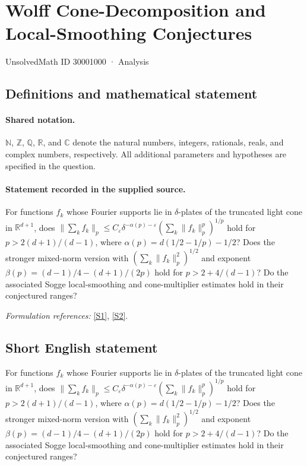 \documentclass[11pt]{article}
\newcommand{\sref}[2]{\hyperlink{source:#1:#2}{[S#2]}}
\begin{document}
\setcounter{section}{30000999}
\section{Wolff Cone-Decomposition and Local-Smoothing Conjectures}\label{30001000}
{\small UnsolvedMath ID 30001000 · Analysis}
\subsection{Definitions and mathematical statement}

\paragraph{Shared notation.}$\mathbb N$, $\mathbb Z$, $\mathbb Q$, $\mathbb R$, and $\mathbb C$ denote the natural numbers, integers, rationals, reals, and complex numbers, respectively. All additional parameters and hypotheses are specified in the question.


\paragraph{Statement recorded in the supplied source.}
For functions $f_k$ whose Fourier supports lie in $\delta$-plates of the truncated light cone in $\mathbb{R}^{d+1}$, does $\lVert\sum_k f_k\rVert_p\leq C_\varepsilon\delta^{-\alpha(p)-\varepsilon}(\sum_k\lVert f_k\rVert_p^p)^{1/p}$ hold for $p>2(d+1)/(d-1)$, where $\alpha(p)=d(1/2-1/p)-1/2$? Does the stronger mixed-norm version with $(\sum_k\lVert f_k\rVert_p^2)^{1/2}$ and exponent $\beta(p)=(d-1)/4-(d+1)/(2p)$ hold for $p>2+4/(d-1)$? Do the associated Sogge local-smoothing and cone-multiplier estimates hold in their conjectured ranges?
\par\smallskip\textit{Formulation references:} \sref{30001000}{1}, \sref{30001000}{2}.
\subsection{Short English statement}
For functions $f_k$ whose Fourier supports lie in $\delta$-plates of the truncated light cone in $\mathbb{R}^{d+1}$, does $\lVert\sum_k f_k\rVert_p\leq C_\varepsilon\delta^{-\alpha(p)-\varepsilon}(\sum_k\lVert f_k\rVert_p^p)^{1/p}$ hold for $p>2(d+1)/(d-1)$, where $\alpha(p)=d(1/2-1/p)-1/2$? Does the stronger mixed-norm version with $(\sum_k\lVert f_k\rVert_p^2)^{1/2}$ and exponent $\beta(p)=(d-1)/4-(d+1)/(2p)$ hold for $p>2+4/(d-1)$? Do the associated Sogge local-smoothing and cone-multiplier estimates hold in their conjectured ranges?
\end{document}
